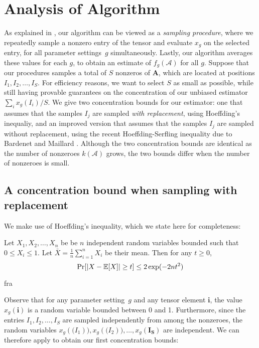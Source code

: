 
\section{Analysis of Algorithm}

As explained in , our algorithm can be viewed as a \emph{sampling procedure}, where we repeatedly sample a nonzero entry of the tensor and evaluate $x_g$ on the selected entry, for all parameter settings~$g$ simultaneously.
Lastly, our algorithm averages these values for each $g$, to obtain an estimate of $f_g(\mathcal{A})$ for all $g$.
Suppose that our procedures samples a total of $S$ nonzeros of $\mathbf{A}$, which are located at positions $I_1, I_2, \dots, I_S$.
For efficiency reasons, we want to select $S$ as small as possible, while still having provable guarantees on the concentration of our unbiased estimator $\sum_i x_g(I_i) / S$.
We give two concentration bounds for our estimator: one that assumes that the samples $I_j$ are sampled \emph{with replacement}, using Hoeffding's inequaliy, and an improved version that assumes that the samples $I_j$ are sampled without replacement, using the recent Hoeffding-Serfling inequality due to Bardenet and Maillard \cite{BM2015}.
Although the two concentration bounds are identical as the number of nonzeroes $k(\mathcal{A})$ grows, the two bounds differ when the number of nonzeroes is small.

\subsection{A concentration bound when sampling with replacement}

We make use of Hoeffding's inequality, which we state here for completeness:

\begin{thm} \label{thm:hoeffding}
Let $X_1, X_2, \dots, X_n$ be be $n$ independent random variables bounded such that $0 \leq X_i \leq 1$.
Let $\bar{X} = \frac{1}{n} \sum_{i = 1}^n X_i$ be their mean.
Then for any $t \geq 0$,
\[
\Pr[|X - \mathbb{E}[X]| \geq t] \leq 2\exp(-2nt^2)
\]
\end{thm}fra

Observe that for any parameter setting~$g$ and any tensor element $\mathbf{i}$, the value $x_g(\mathbf{i})$ is a random variable bounded between 0 and 1.
Furthermore, since the entries $I_1, I_2, \dots, I_S$ are sampled independently from among the nonzeroes, the random variables $x_g(\mathbf(I_1)), x_g(\mathbf(I_2)), \dots, x_g(\mathbf{I_S})$ are independent.
We can therefore apply  to obtain our first concentration bounds:

